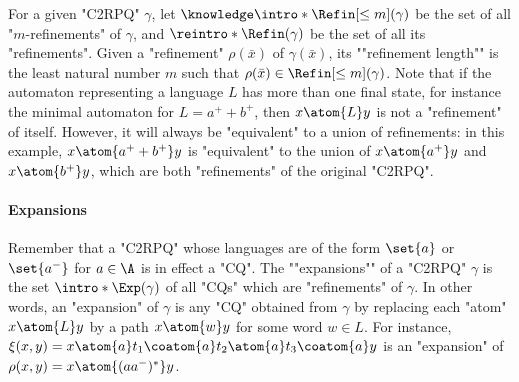 For a given "C2RPQ" $\gamma$, let $\AP\intro*\Refin[\leq m](\gamma)$ be the set of all "$m$-refinements" of $\gamma$, and $\reintro*\Refin(\gamma)$ be the set of all its "refinements".
Given a "refinement" $\rho(\bar x)$ of $\gamma(\bar x)$,
its ""refinement length"" is the least natural number
$m$ such that $\rho(\bar x) \in \Refin[\leq m](\gamma)$.
Note that if the automaton representing a language $L$ has more than one final state, for instance the minimal automaton for $L = a^+ + b^+$,
then $x \atom{L} y$ is not a "refinement" of itself.
However, it will always be "equivalent" to a union of refinements: in
this example, $x \atom{a^+ + b^+} y$ is "equivalent" to the union of
$x \atom{a^+} y$ and $x \atom{b^+} y$, which are both "refinements"
of the original "C2RPQ".

\paragraph*{Expansions}
Remember that a "C2RPQ" whose languages are
of the form $\set{a}$ or $\set{a^-}$ for $a \in \A$ is in effect a "CQ".
The \AP""expansions"" of a "C2RPQ" $\gamma$ is the set $\intro*\Exp(\gamma)$ of all "CQs" which are "refinements" of $\gamma$.
In other words, an "expansion" of $\gamma$ is any "CQ" obtained from $\gamma$
by replacing each "atom" $x \atom{L} y$ by a path $x \atom{w} y$ for some
word $w \in L$.
For instance, $\xi(x,y) = x \atom{a} t_1 \coatom{a} t_2 \atom{a} t_3 \coatom{a} y$
is an "expansion" of $\rho(x,y) = x \atom{(aa^-)^*} y$.


